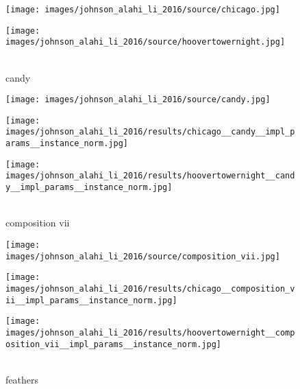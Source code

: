 \begin{figure}[H]
	\begin{minipage}[t]{0.3\textwidth}
		\centering
		\hfill
	\end{minipage}
	\hfill%
	\begin{minipage}[t]{0.3\textwidth}
		\centering
		\texttt{[image: images/johnson\_alahi\_li\_2016/source/chicago.jpg]}
	\end{minipage}
	\hfill%
	\begin{minipage}[t]{0.3\textwidth}
		\centering
		\texttt{[image: images/johnson\_alahi\_li\_2016/source/hoovertowernight.jpg]}
	\end{minipage}
	\hfill \\ candy \hfill \\
	\begin{minipage}[t]{0.3\textwidth}
		\centering
		\texttt{[image: images/johnson\_alahi\_li\_2016/source/candy.jpg]}
	\end{minipage}
	\hfill%
	\begin{minipage}[t]{0.3\textwidth}
		\centering
		\texttt{[image: images/johnson\_alahi\_li\_2016/results/chicago\_\_candy\_\_impl\_params\_\_instance\_norm.jpg]}
	\end{minipage}
	\hfill%
	\begin{minipage}[t]{0.3\textwidth}
		\centering
		\texttt{[image: images/johnson\_alahi\_li\_2016/results/hoovertowernight\_\_candy\_\_impl\_params\_\_instance\_norm.jpg]}
	\end{minipage}
	\hfill \\ composition vii \hfill \\
	\begin{minipage}[t]{0.3\textwidth}
		\centering
		\texttt{[image: images/johnson\_alahi\_li\_2016/source/composition\_vii.jpg]}
	\end{minipage}
	\hfill%
	\begin{minipage}[t]{0.3\textwidth}
		\centering
		\texttt{[image: images/johnson\_alahi\_li\_2016/results/chicago\_\_composition\_vii\_\_impl\_params\_\_instance\_norm.jpg]}
	\end{minipage}
	\hfill%
	\begin{minipage}[t]{0.3\textwidth}
		\centering
		\texttt{[image: images/johnson\_alahi\_li\_2016/results/hoovertowernight\_\_composition\_vii\_\_impl\_params\_\_instance\_norm.jpg]}
	\end{minipage}
	\hfill \\ feathers \hfill \\

\end{figure}
